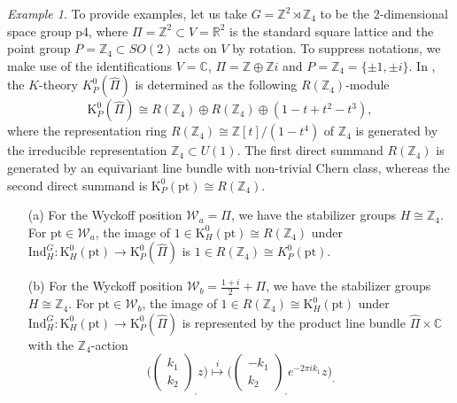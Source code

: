 \documentclass[11pt]{amsart}
\theoremstyle{definition}
\theoremstyle{plain}
\theoremstyle{remark}
\newtheorem{exmp}[equation]{Example}
\newcommand{\bC}{\mathbb{C}}
\newcommand{\bR}{\mathbb{R}}
\newcommand{\bZ}{\mathbb{Z}}
\begin{document}
\begin{exmp}
To provide examples, let us take $G = \bZ^2 \rtimes \bZ_4$ to be the $2$-dimensional space group \textsf{p4}, where $\Pi = \bZ^2 \subset V = \bR^2$ is the standard square lattice and the point group $P = \bZ_4 \subset SO(2)$ acts on $V$ by rotation. To suppress notations, we make use of the identifications $V = \bC$, $\Pi = \bZ \oplus \bZ i$ and $P = \bZ_4 = \{ \pm 1, \pm i\}$. In \cite{shiozakiTopologicalCrystallineMaterials2017}, the $K$-theory $K^0_P(\hat{\Pi})$ is determined as the following $R(\bZ_4)$-module
\[
\mathrm{K}^0_P(\hat{\Pi}) 
\cong R(\bZ_4) \oplus R(\bZ_4) \oplus (1 - t + t ^2  - t^3),
\]
where the representation ring $R(\bZ_4) \cong \bZ[t]/(1 - t^4)$ of $\bZ_4$ is generated by the irreducible representation $\bZ_4 \subset U(1)$. The first direct summand $R(\bZ_4)$ is generated by an equivariant line bundle with non-trivial Chern class, whereas the second direct summand is $\mathrm{K}^0_P(\mathrm{pt}) \cong R(\bZ_4)$. 



\begin{itemize}
\item[(a)]
For the Wyckoff position $\mathcal{W}_a = \Pi$, we have the stabilizer groups $H \cong \bZ_4$. For $\mathrm{pt} \in \mathcal{W}_a$, the image of $1 \in \mathrm{K}^0_H(\mathrm{pt}) \cong R(\bZ_4)$ under $\mathrm{Ind}^G_H \colon \mathrm{K}^0_{H}(\mathrm{pt}) \to \mathrm{K}^0_P(\hat{\Pi})$ is $1 \in R(\bZ_4) \cong K^0_P(\mathrm{pt})$. 


\item[(b)]
For the Wyckoff position $\mathcal{W}_b = \frac{1 + i}{2} + \Pi$, we have the stabilizer groups $H \cong \bZ_4$. For $\mathrm{pt} \in \mathcal{W}_b$, the image of $1 \in R(\bZ_4) \cong \mathrm{K}^0_H(\mathrm{pt})$ under $\mathrm{Ind}^G_H \colon \mathrm{K}^0_{H}(\mathrm{pt}) \to \mathrm{K}^0_P(\hat{\Pi})$ is represented by the product line bundle $\hat{\Pi} \times \bC$ with the $\bZ_4$-action
\[
\Big(
\begin{pmatrix}
k_1 \\ k_2
\end{pmatrix}
_{\textstyle ,} 
z\Big)
\overset{i}{\mapsto}
\Big(
\begin{pmatrix}
-k_1 \\ k_2
\end{pmatrix}
_{\textstyle ,}
e^{-2\pi i k_1}z\Big)_{\textstyle .}
\]



\end{itemize}
\end{exmp}
\end{document}
